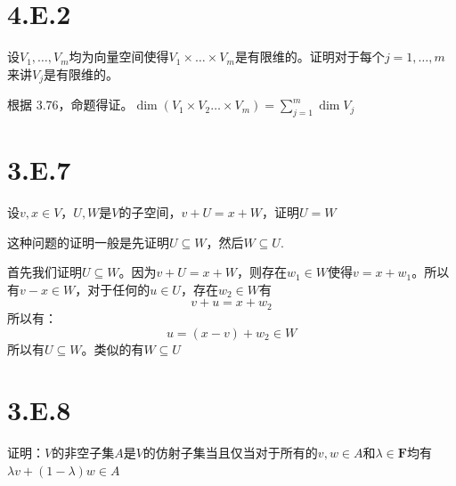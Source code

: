 \documentclass[10pt,a4paper,UTF8]{article}
\begin{document}
\section{4.E.2}
\label{sec:orgdcf6fbd}



\begin{problem}
设\(V_{1},\ldots ,V_{m}\)均为向量空间使得\(V_{1}\times \ldots \times V_{m}\)是有限维的。证明对于每个\(j=1,\ldots ,m\)来讲\(V_{j}\)是有限维的。
\end{problem}

\begin{answer}
根据 3.76，命题得证。\(\dim (V_{1}\times V_{2} \ldots \times V_{m}) = \sum_{j=1}^{m}\dim V_{j}\)
\end{answer}

\section{3.E.7}
\label{sec:org8e42c7e}


\begin{problem}
设\(v,x\in V\)，\(U,W\)是\(V\)的子空间，\(v+U = x + W\)，证明\(U = W\)
\end{problem}

\begin{answer}
这种问题的证明一般是先证明\(U\subseteq W\)，然后\(W\subseteq U\).

首先我们证明\(U\subseteq W\)。因为\(v+U = x + W\)，则存在\(w_{1}\in W\)使得\(v = x+ w_{1}\)。所以有\(v-x \in W\)，对于任何的\(u\in U\)，存在\(w_{2}\in W\)有\[v+u = x+ w_{2}\] 所以有：\[u = (x-v) + w_{2}\in W\]
所以有\(U\subseteq W\)。类似的有\(W\subseteq U\)
\end{answer}

\section{3.E.8}
\label{sec:orgdd632e2}


\begin{problem}
证明：\(V\)的非空子集\(A\)是\(V\)的仿射子集当且仅当对于所有的\(v,w\in A\)和\(\lambda \in \mathbf{F}\)均有\(\lambda v + (1-\lambda)w \in A\)
\end{problem}
\end{document}
